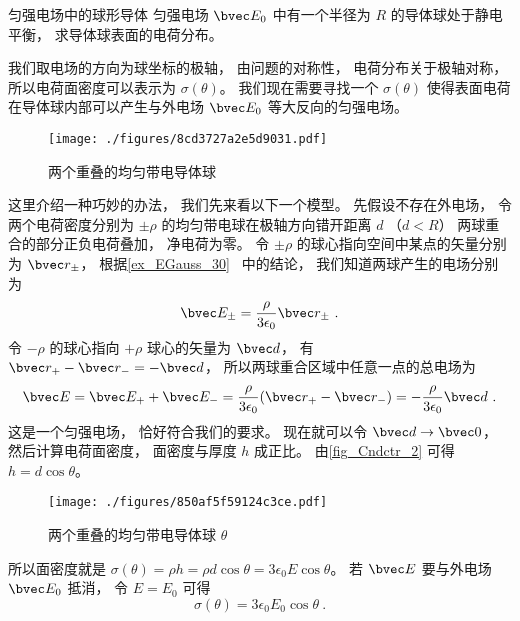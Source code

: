 \begin{example}{匀强电场中的球形导体}
匀强电场 $\bvec E_0$ 中有一个半径为 $R$ 的导体球处于静电平衡， 求导体球表面的电荷分布。

我们取电场的方向为球坐标的极轴， 由问题的对称性， 电荷分布关于极轴对称， 所以电荷面密度可以表示为 $\sigma(\theta)$。 我们现在需要寻找一个 $\sigma(\theta)$ 使得表面电荷在导体球内部可以产生与外电场 $\bvec E_0$ 等大反向的匀强电场。

\begin{figure}[ht]
\centering
\texttt{[image: ./figures/8cd3727a2e5d9031.pdf]}
\caption{两个重叠的均匀带电导体球} \label{fig_Cndctr_1}
\end{figure}

这里介绍一种巧妙的办法， 我们先来看以下一个模型。 先假设不存在外电场， 令两个电荷密度分别为 $\pm\rho$ 的均匀带电球在极轴方向错开距离 $d$ （$d < R$） 两球重合的部分正负电荷叠加， 净电荷为零。 令 $\pm\rho$ 的球心指向空间中某点的矢量分别为 $\bvec r_\pm$， 根据\autoref{ex_EGauss_30}~ 中的结论， 我们知道两球产生的电场分别为
\begin{equation}
\bvec E_\pm = \frac{\rho}{3\epsilon_0}\bvec r_\pm~.
\end{equation}
令 $-\rho$ 的球心指向 $+\rho$ 球心的矢量为 $\bvec d$， 有 $\bvec r_+ - \bvec r_- = -\bvec d$， 所以两球重合区域中任意一点的总电场为
\begin{equation}
\bvec E = \bvec E_+ + \bvec E_- = \frac{\rho}{3\epsilon_0}(\bvec r_+ - \bvec r_-) = -\frac{\rho}{3\epsilon_0}\bvec d~.
\end{equation}
这是一个匀强电场， 恰好符合我们的要求。 现在就可以令 $\bvec d\to \bvec 0$， 然后计算电荷面密度， 面密度与厚度 $h$ 成正比。 由\autoref{fig_Cndctr_2} 可得 $h = d\cos\theta$。

\begin{figure}[ht]
\centering
\texttt{[image: ./figures/850af5f59124c3ce.pdf]}
\caption{两个重叠的均匀带电导体球 $\theta$} \label{fig_Cndctr_2}
\end{figure}

所以面密度就是 $\sigma(\theta) = \rho h = \rho d\cos\theta = 3\epsilon_0 E \cos\theta$。 若 $\bvec E$ 要与外电场 $\bvec E_0$ 抵消， 令 $E = E_0$ 可得
\begin{equation}
\sigma(\theta) = 3\epsilon_0 E_0 \cos\theta~.
\end{equation}
\end{example}

